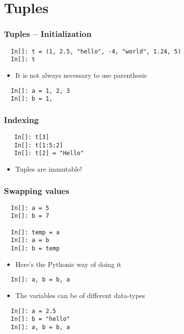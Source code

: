 \section{Tuples}

\begin{frame}[fragile]
  \frametitle{Tuples -- Initialization}
  \begin{lstlisting}
  In[]: t = (1, 2.5, "hello", -4, "world", 1.24, 5)
  In[]: t
  \end{lstlisting}
  \begin{itemize}
  \item It is not always necessary to use parenthesis
  \end{itemize}
  \begin{lstlisting}
  In[]: a = 1, 2, 3 
  In[]: b = 1, 
  \end{lstlisting}
\end{frame}

\begin{frame}[fragile]
  \frametitle{Indexing}
  \begin{lstlisting}
   In[]: t[3]
   In[]: t[1:5:2]
   In[]: t[2] = "Hello"
  \end{lstlisting}
  \begin{itemize}
  \item \alert{Tuples are immutable!}
  \end{itemize}
\end{frame}

\begin{frame}[fragile]
  \frametitle{Swapping values}
  \begin{lstlisting}
  In[]: a = 5
  In[]: b = 7

  In[]: temp = a
  In[]: a = b
  In[]: b = temp
  \end{lstlisting}
  \begin{itemize}
  \item Here's the Pythonic way of doing it
  \end{itemize}
  \begin{lstlisting}
  In[]: a, b = b, a
  \end{lstlisting}
  \begin{itemize}
  \item The variables can be of different data-types
  \end{itemize}
  \begin{lstlisting}
  In[]: a = 2.5
  In[]: b = "hello"
  In[]: a, b = b, a
  \end{lstlisting}
\end{frame}

